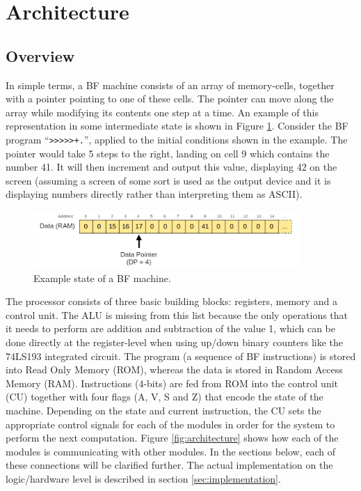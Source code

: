 \section{Architecture} \label{sec:architecture}
\subsection{Overview} \label{sec:architecture:overview}
In simple terms, a BF machine consists of an array of memory-cells, together with a pointer pointing to one of these cells. The pointer can move along the array while modifying its contents one step at a time. An example of this representation in some intermediate state is shown in Figure \ref{fig:simplerepresentation}. Consider the BF program ``\texttt{>>>>>+.}'', applied to the initial conditions shown in the example. The pointer would take 5 steps to the right, landing on cell 9 which contains the number 41. It will then increment and output this value, displaying 42 on the screen (assuming a screen of some sort is used as the output device and it is displaying numbers directly rather than interpreting them as ASCII).

\begin{figure}[H]
  \centering
  \includegraphics[width=0.9\textwidth]{img/simple_representation}
  \caption{Example state of a BF machine.}
  \label{fig:simplerepresentation}
\end{figure}


The processor consists of three basic building blocks: registers, memory and a control unit. The ALU is missing from this list because the only operations that it needs to perform are addition and subtraction of the value 1, which can be done directly at the register-level when using up/down binary counters like the 74LS193 integrated circuit. The program (a sequence of BF instructions) is stored into Read Only Memory (ROM), whereas the data is stored in Random Access Memory (RAM). Instructions (4-bits) are fed from ROM into the control unit (CU) together with four flags (A, V, S and Z) that encode the state of the machine. Depending on the state and current instruction, the CU sets the appropriate control signals for each of the modules in order for the system to perform the next computation. Figure \ref{fig:architecture} shows how each of the modules is communicating with other modules. In the sections below, each of these connections will be clarified further. The actual implementation on the logic/hardware level is described in section \ref{sec:implementation}.

